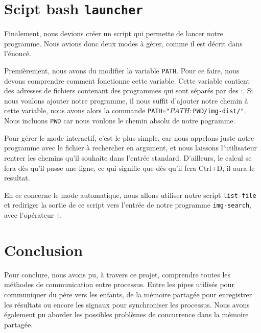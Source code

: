 \documentclass[french]{article}
\begin{document}
\section{Scipt bash \texttt{launcher}}
Finalement, nous devions créer un script qui permette de lancer notre programme. Nous avions donc deux modes à gérer, comme il est décrit dans l'énoncé. 

Premièrement, nous avons du modifier la variable \texttt{PATH}. Pour ce faire, nous devons comprendre comment fonctionne cette variable. Cette variable contient des 
adresses de fichiers contenant des programmes qui sont séparés par des :. Si nous voulons ajouter notre programme, il nous suffit d'ajouter notre chemin à cette 
variable, nous avons alors la commande \texttt{PATH="$PATH:$PWD/img-dist/"}. Nous incluons \texttt{PWD} car nous voulons le chemin absolu de notre pogramme. 

Pour gérer le mode interactif, c'est le plus simple, car nous appelons juste notre programme avec le fichier à rechercher en argument, et nous laissons l'utilisateur 
rentrer les chemins qu'il souhaite dans l'entrée standard. D'ailleurs, le calcul se fera dès qu'il passe une ligne, ce qui signifie que dès qu'il fera Ctrl+D, 
il aura le resultat. 

En ce concerne le mode automatique, nous allons utiliser notre script \texttt{list-file} et rediriger la sortie de ce script vers l'entrée 
de notre programme \texttt{img-search}, avec l'opérateur \texttt{|}. 

\section{Conclusion}
Pour conclure, nous avons pu, à travers ce projet, comprendre toutes les méthodes de communication entre processus. Entre les pipes utilisés pour communiquer du 
père vers les enfants, de la mémoire partagée pour enregistrer les résultats ou encore les signaux pour synchroniser les processus. Nous avons également pu 
aborder les possibles problèmes de concurrence dans la mémoire partagée.
\end{document}
